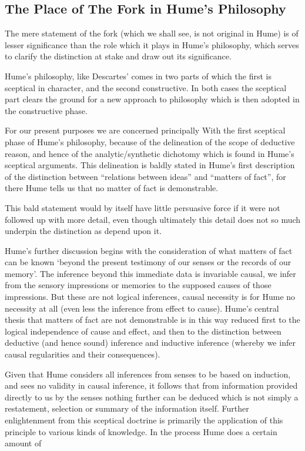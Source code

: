 \subsection{The Place of The Fork in Hume's Philosophy}

The mere statement of the fork (which we shall see, is not original in
Hume) is of lesser significance than the role which it plays in Hume's
philosophy, which serves to clarify the distinction at stake and draw
out its significance.

Hume's philosophy, like Descartes' comes in two parts of which the
first is sceptical in character, and the second constructive.
In both cases the sceptical part clears the ground for a new approach
to philosophy which is then adopted in the constructive phase.

For our present purposes we are concerned principally With the first
sceptical phase of Hume's philosophy, because of the delineation of the scope
of deductive reason, and hence of the analytic/\-synthetic dichotomy
which is found in Hume's sceptical arguments.
This delineation is baldly stated in Hume's first description of the
distinction between ``relations between ideas'' and ``matters of
fact'', for there Hume tells us that no matter of fact is
demonstrable.

This bald statement would by itself have little persuasive force if it
were not followed up with more detail, even though ultimately this
detail does not so much underpin the distinction as depend upon it.

Hume's further discussion begins with the consideration of what
matters of fact can be known `beyond the present testimony of 
our senses or the records of our memory'.
The inference beyond this immediate data is invariable causal, we
infer from the sensory impressions or memories to the supposed causes
of those impressions.
But these are not logical inferences, causal necessity is for Hume no
necessity at all (even less the inference from effect to cause).
Hume's central thesis that matters of fact are not demonstrable is
in this way reduced first to the logical independence of cause and
effect, and then to the distinction between deductive (and hence sound)
inference and inductive inference (whereby we infer causal
regularities and their consequences).

Given that Hume considers all inferences from senses to be based on
induction, and sees no validity in causal inference, it follows that
from information provided directly to us by the senses nothing further
can be deduced which is not simply a restatement, selection or summary
of the information itself.
Further enlightenment from this sceptical doctrine is primarily the
application of this principle to various kinds of knowledge.
In the process Hume does a certain amount of 



